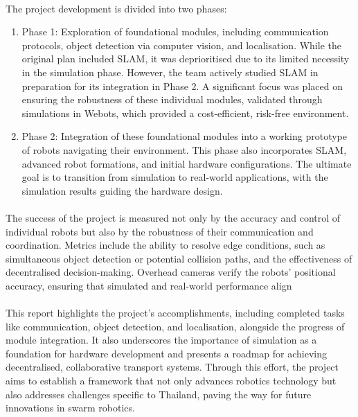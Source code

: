 \paragraph*{}
The project development is divided into two phases:

\begin{enumerate}
    \item Phase 1: Exploration of foundational modules, including communication protocols, object detection via computer vision, and localisation. While the original plan included SLAM, it was deprioritised due to its limited necessity in the simulation phase. However, the team actively studied SLAM in preparation for its integration in Phase 2. A significant focus was placed on ensuring the robustness of these individual modules, validated through simulations in Webots, which provided a cost-efficient, risk-free environment.
    \item Phase 2: Integration of these foundational modules into a working prototype of robots navigating their environment. This phase also incorporates SLAM, advanced robot formations, and initial hardware configurations. The ultimate goal is to transition from simulation to real-world applications, with the simulation results guiding the hardware design.
\end{enumerate}

\paragraph*{}
The success of the project is measured not only by the accuracy and control of individual robots but also by the robustness of their communication and coordination. Metrics include the ability to resolve edge conditions, such as simultaneous object detection or potential collision paths, and the effectiveness of decentralised decision-making. Overhead cameras verify the robots’ positional accuracy, ensuring that simulated and real-world performance align

\paragraph*{}
This report highlights the project’s accomplishments, including completed tasks like communication, object detection, and localisation, alongside the progress of module integration. It also underscores the importance of simulation as a foundation for hardware development and presents a roadmap for achieving decentralised, collaborative transport systems. Through this effort, the project aims to establish a framework that not only advances robotics technology but also addresses challenges specific to Thailand, paving the way for future innovations in swarm robotics.


